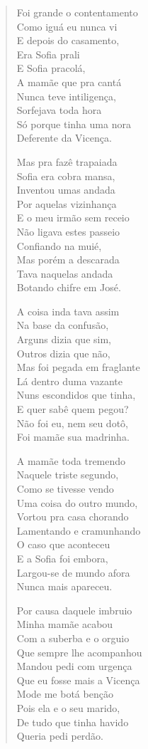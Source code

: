 \begin{verse}
Foi grande o contentamento\\
Como iguá eu nunca vi\\
E depois do casamento,\\
Era Sofia prali\\
E Sofia pracolá,\\
A mamãe que pra cantá\\
Nunca teve intiligença,\\
Sorfejava toda hora\\
Só porque tinha uma nora\\
Deferente da Vicença.

Mas pra fazê trapaiada\\
Sofia era cobra mansa,\\
Inventou umas andada\\
Por aquelas vizinhança\\
E o meu irmão sem receio\\
Não ligava estes passeio\\
Confiando na muié,\\
Mas porém a descarada\\
Tava naquelas andada\\
Botando chifre em José.

A coisa inda tava assim\\
Na base da confusão,\\
Arguns dizia que sim,\\
Outros dizia que não,\\
Mas foi pegada em fraglante\\
Lá dentro duma vazante\\
Nuns escondidos que tinha,\\
E quer sabê quem pegou?\\
Não foi eu, nem seu dotô,\\
Foi mamãe sua madrinha.

A mamãe toda tremendo\\
Naquele triste segundo,\\
Como se tivesse vendo\\
Uma coisa do outro mundo,\\
Vortou pra casa chorando\\
Lamentando e cramunhando\\
O caso que aconteceu\\
E a Sofia foi embora,\\
Largou-se de mundo afora\\
Nunca mais apareceu.

Por causa daquele imbruio\\
Minha mamãe acabou\\
Com a suberba e o orguio\\
Que sempre lhe acompanhou\\
Mandou pedi com urgença\\
Que eu fosse mais a Vicença\\
Mode me botá benção\\
Pois ela e o seu marido,\\
De tudo que tinha havido\\
Queria pedi perdão.


\end{verse}
